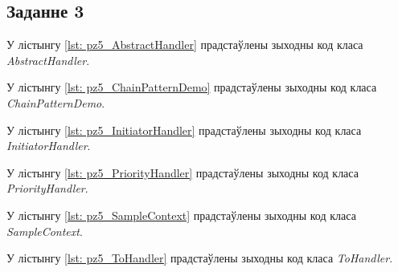\subsection{Заданне 3}


У лістынгу \ref{lst: pz5_AbstractHandler} прадстаўлены зыходны код класа \textit{AbstractHandler}.



У лістынгу \ref{lst: pz5_ChainPatternDemo} прадстаўлены зыходны код класа \textit{ChainPatternDemo}.



У лістынгу \ref{lst: pz5_InitiatorHandler} прадстаўлены зыходны код класа \textit{InitiatorHandler}.



У лістынгу \ref{lst: pz5_PriorityHandler} прадстаўлены зыходны код класа \textit{PriorityHandler}.



У лістынгу \ref{lst: pz5_SampleContext} прадстаўлены зыходны код класа \textit{SampleContext}.



У лістынгу \ref{lst: pz5_ToHandler} прадстаўлены зыходны код класа \textit{ToHandler}.


